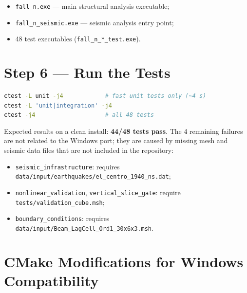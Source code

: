 \begin{itemize}
  \item \texttt{fall\_n.exe} --- main structural analysis executable;
  \item \texttt{fall\_n\_seismic.exe} --- seismic analysis entry point;
  \item 48 test executables (\texttt{fall\_n\_*\_test.exe}).
\end{itemize}

\section{Step 6 — Run the Tests}
\label{sec:win-tests}

\begin{lstlisting}[language=bash, basicstyle=\ttfamily\small,
    keywordstyle=\bfseries\color{blue!70!black},
    commentstyle=\itshape\color{green!50!black},
    stringstyle=\color{red!60!black},
    frame=single, framerule=0.4pt, rulecolor=\color{gray!50},
    breaklines=true, showstringspaces=false]
ctest -L unit -j4            # fast unit tests only (~4 s)
ctest -L 'unit|integration' -j4
ctest -j4                    # all 48 tests
\end{lstlisting}

Expected results on a clean install: \textbf{44/48 tests pass}.  The 4
remaining failures are not related to the Windows port; they are caused by
missing mesh and seismic data files that are not included in the repository:

\begin{itemize}
  \item \texttt{seismic\_infrastructure}: requires
        \texttt{data/input/earthquakes/el\_centro\_1940\_ns.dat};
  \item \texttt{nonlinear\_validation}, \texttt{vertical\_slice\_gate}:
        require \texttt{tests/validation\_cube.msh};
  \item \texttt{boundary\_conditions}: requires
        \texttt{data/input/Beam\_LagCell\_Ord1\_30x6x3.msh}.
\end{itemize}

\section{CMake Modifications for Windows Compatibility}
\label{sec:win-cmake-changes}

